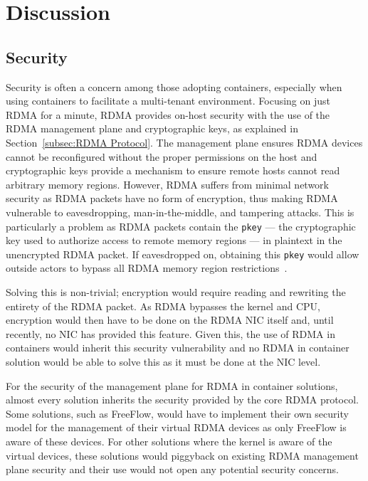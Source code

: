 \documentclass[12pt,titlepage]{article}
\begin{document}
\section{Discussion}
\subsection{Security}
Security is often a concern among those adopting containers, especially when using containers to facilitate a multi-tenant environment.
Focusing on just RDMA for a minute, RDMA provides on-host security with the use of the RDMA management plane and cryptographic keys, as explained in Section~\ref{subsec:RDMA Protocol}.
The management plane ensures RDMA devices cannot be reconfigured without the proper permissions on the host and cryptographic keys provide a mechanism to ensure remote hosts cannot read arbitrary memory regions.
However, RDMA suffers from minimal network security as RDMA packets have no form of encryption, thus making RDMA vulnerable to eavesdropping, man-in-the-middle, and tampering attacks.
This is particularly a problem as RDMA packets contain the \texttt{pkey} --- the cryptographic key used to authorize access to remote memory regions --- in plaintext in the unencrypted RDMA packet.
If eavesdropped on, obtaining this \texttt{pkey} would allow outside actors to bypass all RDMA memory region restrictions~\cite{rdmasecurity}.

Solving this is non-trivial; encryption would require reading and rewriting the entirety of the RDMA packet. 
As RDMA bypasses the kernel and CPU, encryption would then have to be done on the RDMA NIC itself and, until recently, no NIC has provided this feature.
Given this, the use of RDMA in containers would inherit this security vulnerability and no RDMA in container solution would be able to solve this as it must be done at the NIC level.

For the security of the management plane for RDMA in container solutions, almost every solution inherits the security provided by the core RDMA protocol.
Some solutions, such as FreeFlow, would have to implement their own security model for the management of their virtual RDMA devices as only FreeFlow is aware of these devices.
For other solutions where the kernel is aware of the virtual devices, these solutions would piggyback on existing RDMA management plane security and their use would not open any potential security concerns.
\end{document}

